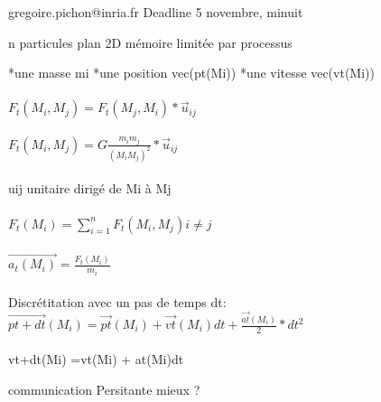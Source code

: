\documentclass{article}
\begin{document}
gregoire.pichon@inria.fr
Deadline 5 novembre, minuit

n particules plan 2D
mémoire limitée par processus

*une masse mi
*une position vec(pt(Mi)) 
*une vitesse vec(vt(Mi))

\paragraph{}
$ F_t(M_i, M_j) = F_t(M_j, M_i) * \overrightarrow{u}_{ij} $
\paragraph{}
$ F_t(M_i, M_j) = G \frac{m_i m_j}{(M_i M_j)^2} * \overrightarrow{u}_{ij} $
\paragraph{}
uij unitaire dirigé de Mi à Mj
\paragraph{}
$ F_t(M_i) = \sum_{i=1}^{n}  F_t(M_i, M_j) i \not= j $
\paragraph{}
$ \overrightarrow{a_t(M_i)} = \frac{F_t(M_i)}{m_i} $
\paragraph{}
Discrétitation avec un pas de temps dt: 
$ \overrightarrow{pt+dt}(M_i) = \overrightarrow{pt}(M_i) + \overrightarrow{vt}(M_i)dt + \frac{\overrightarrow{at}(M_i)}{2} * dt^2 $
\paragraph{}
vt+dt(Mi)  =vt(Mi) + at(Mi)dt


communication Persitante mieux ?
\end{document}
